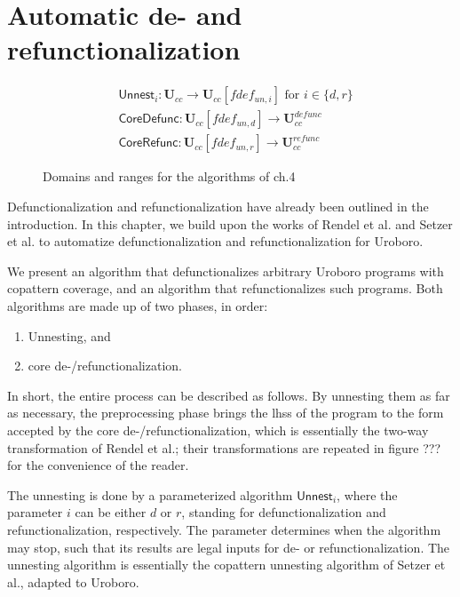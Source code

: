 \chapter{Automatic de- and refunctionalization}

\begin{figure}
\begin{align*}
& \textsf{Unnest}_i: \mathbf{U}_{cc} \to \mathbf{U}_{cc}[fdef_{un,i}] \text{ for } i \in \{d,r\} \\
& \textsf{CoreDefunc}: \mathbf{U}_{cc}[fdef_{un,d}] \to \mathbf{U}^{defunc}_{cc} \\
& \textsf{CoreRefunc}: \mathbf{U}_{cc}[fdef_{un,r}] \to \mathbf{U}^{refunc}_{cc}
\end{align*}
\caption{Domains and ranges for the algorithms of ch.4}
\label{fig:ch4domrng}
\end{figure}

Defunctionalization and refunctionalization have already been outlined in the introduction. In this chapter, we build upon the works of Rendel et al.\cite{rendel15automatic} and Setzer et al.\cite{setzer14unnesting} to automatize defunctionalization and refunctionalization for Uroboro. 

We present an algorithm that defunctionalizes arbitrary Uroboro programs with copattern coverage, and an algorithm that refunctionalizes such programs. Both algorithms are made up of two phases, in order:
\begin{enumerate}
\item Unnesting, and
\item core de-/refunctionalization.
\end{enumerate}

In short, the entire process can be described as follows. By unnesting them as far as necessary, the preprocessing phase brings the lhss of the program to the form accepted by the core de-/refunctionalization, which is essentially the two-way transformation of Rendel et al.; their transformations are repeated in figure ??? for the convenience of the reader.

The unnesting is done by a parameterized algorithm $\textsf{Unnest}_i$, where the parameter $i$ can be either $d$ or $r$, standing for defunctionalization and refunctionalization, respectively. The parameter determines when the algorithm may stop, such that its results are legal inputs for de- or refunctionalization. The unnesting algorithm is essentially the copattern unnesting algorithm of Setzer et al.\cite{setzer14unnesting}, adapted to Uroboro.


